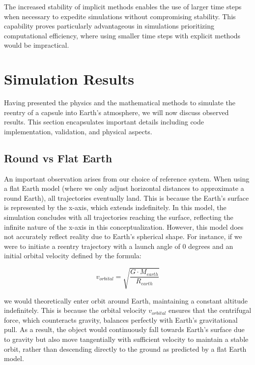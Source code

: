 \documentclass[runningheads]{llncs}
\begin{document}
The increased stability of implicit methods enables the use of larger time steps when necessary to expedite simulations without compromising stability. This capability proves particularly advantageous in simulations prioritizing computational efficiency, where using smaller time steps with explicit methods would be impractical.








\section{Simulation Results}

Having presented the physics and the mathematical methods to simulate the reentry of a capsule into Earth's atmosphere, we will now discuss observed results. This section encapsulates important details including code implementation, validation, and physical aspects.


\subsection{Round vs Flat Earth}
An important observation arises from our choice of reference system. When using a flat Earth model (where we only adjust horizontal distances to approximate a round Earth), all trajectories eventually land. This is because the Earth's surface is represented by the x-axis, which extends indefinitely. In this model, the simulation concludes with all trajectories reaching the surface, reflecting the infinite nature of the x-axis in this conceptualization. However, this model does not accurately reflect reality due to Earth's spherical shape. For instance, if we were to initiate a reentry trajectory with a launch angle of 0 degrees and an initial orbital velocity defined by the formula:

\[ v_{orbital} = \sqrt{\frac{G \cdot M_{earth}}{R_{earth}}} \]

we would theoretically enter orbit around Earth, maintaining a constant altitude indefinitely. This is because the orbital velocity \( v_{orbital} \) ensures that the centrifugal force, which counteracts gravity, balances perfectly with Earth's gravitational pull. As a result, the object would continuously fall towards Earth's surface due to gravity but also move tangentially with sufficient velocity to maintain a stable orbit, rather than descending directly to the ground as predicted by a flat Earth model.
\end{document}
